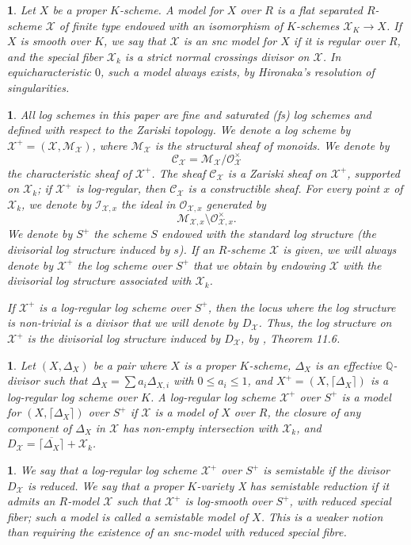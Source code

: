 \documentclass{amsart}%
\numberwithin{equation}{subsection}
\theoremstyle{plain2}
\theoremstyle{definition2}
\theoremstyle{stepstyle}
\theoremstyle{point}
\theoremstyle{subpoint}
\newtheorem{subpoint}[equation]{}%
\newcommand{\spa}[1]{\begin{subpoint}#1\end{subpoint}}           %
\newcommand{\Q}{\ensuremath{\mathbb{Q}}}
\newcommand{\cX}{\ensuremath{\mathscr{X}}}
\newcommand{\caM}{\ensuremath{\mathcal{M}}}
\newcommand{\caC}{\ensuremath{\mathcal{C}}}
\begin{document}
\spa{Let $X$ be a proper $K$-scheme. A model for $X$ over $R$ is a flat separated $R$-scheme $\cX$ of finite type endowed with an isomorphism of $K$-schemes $\cX_K \rightarrow X$. If $X$ is smooth over $K$,
we say that $\cX$ is an snc model for $X$ if it is regular over $R$, and the
special fiber $\cX_k$ is a strict normal crossings divisor on $\cX$. In equicharacteristic $0$, such a model always exists, by Hironaka's resolution of singularities.}

\spa{ \label{sss-log} All log schemes in this paper are  fine and saturated (\emph{fs}) log schemes and defined with respect to the Zariski topology. We denote a log scheme by $\cX^+=(\cX,\caM_{\cX})$, where $\caM_{\cX}$ is the structural sheaf of monoids. We denote by $$\mathcal{C}_{\cX}=\mathcal{M}_{\cX}/\mathcal{O}_{\cX}^{\times}$$
the characteristic sheaf of $\cX^+$. The sheaf $\mathcal{C}_{\cX}$
is a Zariski sheaf on $\cX^+$, supported on $\cX_k$; if $\cX^+$ is log-regular, then $\caC_{\cX}$ is a constructible sheaf.
For every point $x$ of $\cX_k$, we denote by $\mathcal{I}_{\cX,x}$
the ideal in $\mathcal{O}_{\cX,x}$ generated by
$$\mathcal{M}_{\cX,x}\setminus \mathcal{O}_{\cX,x}^{\times}.$$ We denote
by $S^+$ the scheme $S$ endowed with the standard log structure
(the divisorial log structure induced by $s$). If an $R$-scheme $\cX$ is given, we will always denote by $\cX^+$ the log scheme over $S^+$ that we obtain by endowing $\cX$ with the divisorial log structure associated with
$\cX_k$.

If $\cX^+$ is a log-regular log scheme over $S^+$, then the locus where the log structure is non-trivial is a divisor that we will denote by $D_{\cX}$. Thus, the log structure on $\cX^+$ is the divisorial log structure induced by $D_{\cX}$, by \cite{Kato1994a}, Theorem 11.6.

}

\spa{Let $(X,\Delta_X)$ be a pair where $X$ is a proper $K$-scheme, $\Delta_X$ is an effective $\Q$-divisor such that $\Delta_X= \sum a_i \Delta_{X,i}$ with $0 \leqslant a_i \leqslant 1$, and $X^+=(X,\lceil \Delta_X \rceil)$ is a log-regular log scheme over $K$. A log-regular log scheme $\cX^+$ over $S^+$ is a model for $(X,\lceil \Delta_X \rceil)$ over $S^+$ if $\cX$ is a model of $X$ over $R$, the closure of any component of $\Delta_X$ in $\cX$ has non-empty intersection with $\cX_k$, and $D_\cX = \overline{\lceil \Delta_X \rceil} + \cX_k$. }

\spa{We say that a log-regular log scheme $\cX^+$ over $S^+$ is semistable if the divisor $D_\cX$ is reduced. We say that a proper $K$-variety X has semistable reduction if it admits an $R$-model $\cX$ such that $\cX^+$ is log-smooth over $S^+$, with reduced special fiber; such a model is called a semistable model of $X$. This is a weaker notion than requiring the existence of an snc-model with reduced special fibre.}
\end{document}
